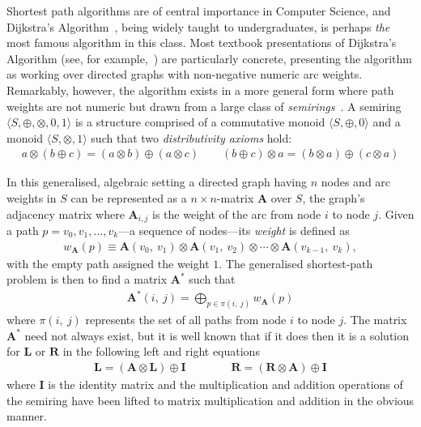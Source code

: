 Shortest path algorithms are of central importance in Computer Science, and Dijkstra's Algorithm~\cite{dijkstra:note:1959}, being widely taught to undergraduates, is perhaps \emph{the} most famous algorithm in this class.
Most textbook presentations of Dijkstra's Algorithm (see, for example,~\cite[Chapter 24]{clrs}) are particularly concrete, presenting the algorithm as working over directed graphs with non-negative numeric arc weights.
Remarkably, however, the algorithm exists in a more general form where path weights are not numeric but drawn from a large class of \emph{semirings}~\cite{gondran_graphs_2008}.
A semiring $\langle S, \oplus, \otimes, 0, 1 \rangle$ is a structure comprised of a commutative monoid $\langle S, \oplus, 0\rangle$ and a monoid $\langle S, \otimes, 1\rangle$ such that two \emph{distributivity axioms} hold:
\begin{gather*}
a\otimes (b \oplus c) = (a\otimes b) \oplus (a\otimes c) \qquad
(b \oplus c) \otimes a = (b\otimes a) \oplus (c\otimes a)
\end{gather*}

In this generalised, algebraic setting a directed graph having $n$ nodes and arc weights in $S$ can be represented as a $n\times n$-matrix $\mathbf{A}$ over $S$, the graph's adjacency matrix where \(\mathbf{A}_{i,j}\) is the weight of the arc from node \(i\) to node \(j\).
Given a path $p = v_0, v_1, \ldots, v_k$---a sequence of nodes---its \emph{weight} is defined as
\begin{gather*}
    w_{\mathbf{A}}(p)
    \equiv
    \mathbf{A}(v_0,\ v_1)
    \otimes \mathbf{A}(v_1,\ v_2)
    \otimes \cdots
    \otimes \mathbf{A}(v_{k-1},\ v_k),
\end{gather*}
with the empty path assigned the weight $1$.
The generalised shortest-path problem is then to find a matrix $\mathbf{A}^*$ such that
\begin{gather*}
\label{eq:global}
\mathbf{A}^*(i,\ j) = \displaystyle\bigoplus_{p \in \pi(i,\ j)} w_{\mathbf{A}}(p)
\end{gather*}
where $\pi(i,\ j)$ represents the set of all paths from node $i$ to node $j$.
The matrix $\mathbf{A}^*$ need not always exist, but it is well known that if it does then it is a solution for $\mathbf{L}$ or $\mathbf{R}$ in the following left and right equations
\begin{gather*}
\mathbf{L} = (\mathbf{A} \otimes \mathbf{L}) \oplus \mathbf{I} \qquad\qquad
\mathbf{R} = (\mathbf{R} \otimes \mathbf{A}) \oplus \mathbf{I}
\end{gather*}
where $\mathbf{I}$ is the identity matrix and the multiplication and addition operations of the semiring have been lifted to matrix multiplication and addition in the obvious manner.


